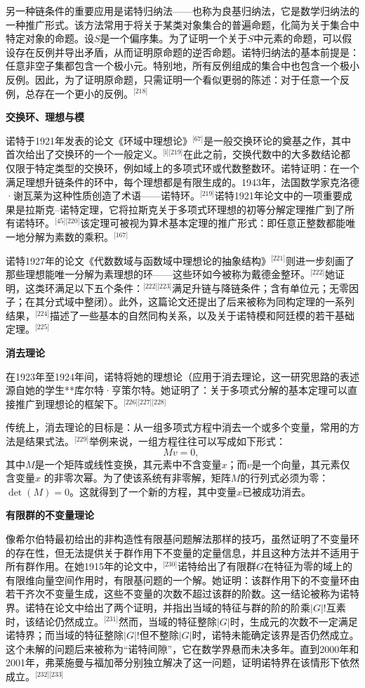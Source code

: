 另一种链条件的重要应用是诺特归纳法——也称为良基归纳法，它是数学归纳法的一种推广形式。该方法常用于将关于某类对象集合的普遍命题，化简为关于集合中特定对象的命题。设$S$是一个偏序集。为了证明一个关于$S$中元素的命题，可以假设存在反例并导出矛盾，从而证明原命题的逆否命题。诺特归纳法的基本前提是：任意非空子集都包含一个极小元。特别地，所有反例组成的集合中也包含一个极小反例。因此，为了证明原命题，只需证明一个看似更弱的陈述：对于任意一个反例，总存在一个更小的反例。\(^\text{[218]}\)

\textbf{交换环、理想与模}

诺特于1921年发表的论文《环域中理想论》\(^\text{[67]}\)是一般交换环论的奠基之作，其中首次给出了交换环的一个一般定义。\(^\text{[i][219]}\)在此之前，交换代数中的大多数结论都仅限于特定类型的交换环，例如域上的多项式环或代数整数环。诺特证明：在一个满足理想升链条件的环中，每个理想都是有限生成的。1943年，法国数学家克洛德·谢瓦莱为这种性质创造了术语——诺特环。\(^\text{[219]}\)诺特1921年论文中的一项重要成果是拉斯克–诺特定理，它将拉斯克关于多项式环理想的初等分解定理推广到了所有诺特环。\(^\text{[45][220]}\)该定理可被视为算术基本定理的推广形式：即任意正整数都能唯一地分解为素数的乘积。\(^\text{[167]}\)

诺特1927年的论文《代数数域与函数域中理想论的抽象结构》\(^\text{[221]}\)则进一步刻画了那些理想能唯一分解为素理想的环——这些环如今被称为戴德金整环。\(^\text{[222]}\)她证明，这类环满足以下五个条件：\(^\text{[222][223]}\)满足升链与降链条件；含有单位元；无零因子；在其分式域中整闭）。此外，这篇论文还提出了后来被称为同构定理的一系列结果，\(^\text{[224]}\)描述了一些基本的自然同构关系，以及关于诺特模和阿廷模的若干基础定理。\(^\text{[225]}\)

\textbf{消去理论}

在1923年至1924年间，诺特将她的理想论（应用于消去理论，这一研究思路的表述源自她的学生**库尔特·亨策尔特。她证明了：关于多项式分解的基本定理可以直接推广到理想论的框架下。\(^\text{[226][227][228]}\)

传统上，消去理论的目标是：从一组多项式方程中消去一个或多个变量，常用的方法是结果式法。\(^\text{[229]}\)举例来说，一组方程往往可以写成如下形式：
$$
M v = 0,~
$$
其中$M$是一个矩阵或线性变换，其元素中不含变量$x$；而$v$是一个向量，其元素仅含变量$x$ 的非零次幂。为了使该系统有非零解，矩阵$M$的行列式必须为零：$\det(M) = 0$。这就得到了一个新的方程，其中变量$x$已被成功消去。

\textbf{有限群的不变量理论}

像希尔伯特最初给出的非构造性有限基问题解法那样的技巧，虽然证明了不变量环的存在性，但无法提供关于群作用下不变量的定量信息，并且这种方法并不适用于所有群作用。在她1915年的论文中，\(^\text{[230]}\)诺特给出了有限群$G$在特征为零的域上的有限维向量空间作用时，有限基问题的一个解。她证明：该群作用下的不变量环由若干齐次不变量生成，这些不变量的次数不超过该群的阶数。这一结论被称为诺特界。诺特在论文中给出了两个证明，并指出当域的特征与群的阶的阶乘$|G|!$互素时，该结论仍然成立。\(^\text{[231]}\)然而，当域的特征整除$|G|$时，生成元的次数不一定满足诺特界；而当域的特征整除$|G|!$但不整除$|G|$时，诺特未能确定该界是否仍然成立。这个未解的问题后来被称为“诺特间隙”，它在数学界悬而未决多年。直到2000年和2001年，弗莱施曼与福加蒂分别独立解决了这一问题，证明诺特界在该情形下依然成立。\(^\text{[232][233]}\)

